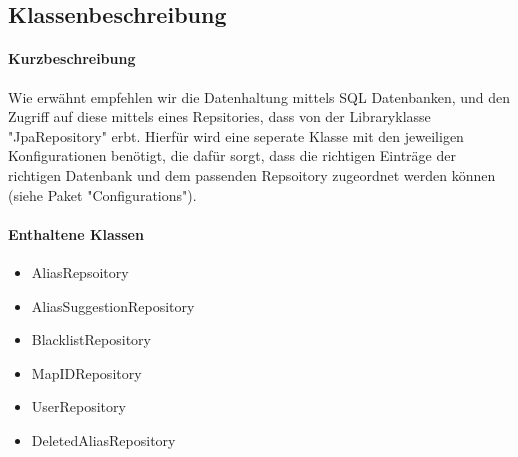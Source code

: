 \subsection*{Klassenbeschreibung}%
\paragraph*{Kurzbeschreibung}
Wie erwähnt empfehlen wir die Datenhaltung mittels SQL Datenbanken, und den Zugriff auf diese mittels eines Repsitories,
dass von der Libraryklasse "JpaRepository" erbt. Hierfür wird eine seperate Klasse mit den jeweiligen Konfigurationen benötigt,
die dafür sorgt, dass die richtigen Einträge der richtigen Datenbank und dem passenden Repsoitory zugeordnet werden können (siehe Paket "Configurations").

\paragraph*{Enthaltene Klassen}
\begin{itemize}
    \item AliasRepsoitory
    \item AliasSuggestionRepository
    \item BlacklistRepository
    \item MapIDRepository
    \item UserRepository
    \item DeletedAliasRepository
\end{itemize}
